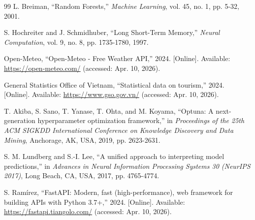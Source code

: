 \documentclass[12pt,a4paper]{report}
\begin{document}
\begin{thebibliography}{99}
L. Breiman, ``Random Forests,'' \textit{Machine Learning}, vol. 45, no. 1, pp. 5-32, 2001.

S. Hochreiter and J. Schmidhuber, ``Long Short-Term Memory,'' \textit{Neural Computation}, vol. 9, no. 8, pp. 1735-1780, 1997.

Open-Meteo, ``Open-Meteo - Free Weather API,'' 2024. [Online]. Available: \url{https://open-meteo.com/} (accessed: Apr. 10, 2026).

General Statistics Office of Vietnam, ``Statistical data on tourism,'' 2024. [Online]. Available: \url{https://www.gso.gov.vn/} (accessed: Apr. 10, 2026).

T. Akiba, S. Sano, T. Yanase, T. Ohta, and M. Koyama, ``Optuna: A next-generation hyperparameter optimization framework,'' in \textit{Proceedings of the 25th ACM SIGKDD International Conference on Knowledge Discovery and Data Mining}, Anchorage, AK, USA, 2019, pp. 2623-2631.

S. M. Lundberg and S.-I. Lee, ``A unified approach to interpreting model predictions,'' in \textit{Advances in Neural Information Processing Systems 30 (NeurIPS 2017)}, Long Beach, CA, USA, 2017, pp. 4765-4774.

S. Ram\'irez, ``FastAPI: Modern, fast (high-performance), web framework for building APIs with Python 3.7+,'' 2024. [Online]. Available: \url{https://fastapi.tiangolo.com/} (accessed: Apr. 10, 2026).

\end{thebibliography}
\end{document}
